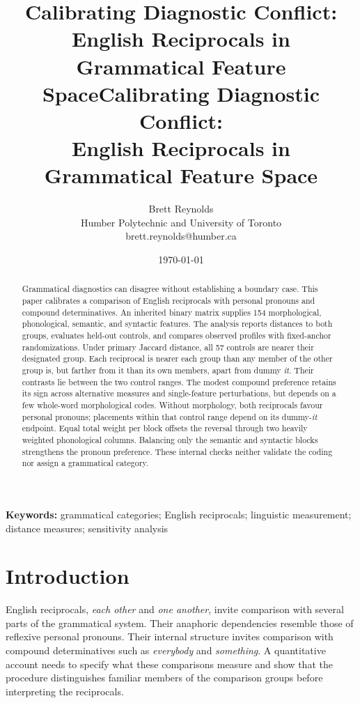 \documentclass[12pt]{article}
\title{Calibrating Diagnostic Conflict:\\English Reciprocals in Grammatical Feature Space}
\title{Calibrating Diagnostic Conflict:\\English Reciprocals in Grammatical Feature Space}
\author{}
\date{}
\author{Brett Reynolds \orcidlink{0000-0003-0073-7195} \\
Humber Polytechnic and University of Toronto \\
brett.reynolds@humber.ca}
\date{\today}
\providecommand{\mention}[1]{\textit{#1}}
\newif\ifcjlsubmission
\begin{document}
\maketitle

\ifcjlsubmission
\else
\fi

\begin{abstract}
\singlespacing
Grammatical diagnostics can disagree without establishing a boundary case. This paper calibrates a comparison of English reciprocals with personal pronouns and compound determinatives. An inherited binary matrix supplies 154 morphological, phonological, semantic, and syntactic features. The analysis reports distances to both groups, evaluates held-out controls, and compares observed profiles with fixed-anchor randomizations. Under primary Jaccard distance, all 57 controls are nearer their designated group. Each reciprocal is nearer each group than any member of the other group is, but farther from it than its own members, apart from dummy \mention{it}. Their contrasts lie between the two control ranges. The modest compound preference retains its sign across alternative measures and single-feature perturbations, but depends on a few whole-word morphological codes. Without morphology, both reciprocals favour personal pronouns; placements within that control range depend on its dummy-\mention{it} endpoint. Equal total weight per block offsets the reversal through two heavily weighted phonological columns. Balancing only the semantic and syntactic blocks strengthens the pronoun preference. These internal checks neither validate the coding nor assign a grammatical category.
\end{abstract}

\noindent\textbf{Keywords:} grammatical categories; English reciprocals; linguistic measurement; distance measures; sensitivity analysis
\clearpage




\section{Introduction}

English reciprocals, \mention{each other} and \mention{one another}, invite comparison with several parts of the grammatical system. Their anaphoric dependencies resemble those of reflexive personal pronouns. Their internal structure invites comparison with compound determinatives such as \mention{everybody} and \mention{something}. A quantitative account needs to specify what these comparisons measure and show that the procedure distinguishes familiar members of the comparison groups before interpreting the reciprocals.
\end{document}
